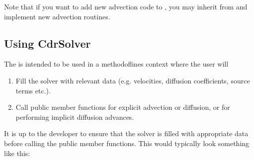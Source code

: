 \documentclass[letterpaper,10pt,english]{sphinxmanual}
\begin{document}
Note that if you want to add new advection code to , you may inherit from  and implement new advection routines.


\subsection{Using CdrSolver}
\label{\detokenize{Solvers/CDR:using-cdrsolver}}
The  is intended to be used in a method\sphinxhyphen{}of\sphinxhyphen{}lines context where the user will
\begin{enumerate}
%
\item {} 
Fill the solver with relevant data (e.g. velocities, diffusion coefficients, source terms etc.).

\item {} 
Call public member functions for explicit advection or diffusion, or for performing implicit diffusion advances.

\end{enumerate}

It is up to the developer to ensure that the solver is filled with appropriate data before calling the public member functions.
This would typically look something like this:

\begin{sphinxVerbatim}[commandchars=\\\{\},formatcom=\scriptsize]
   
        
       \PYG{p}{[}\PYG{p}{]}

         
         \PYG{p}{[}\PYG{p}{]}\PYG{p}{[}\PYG{p}{]}


\end{sphinxVerbatim}
\end{document}
